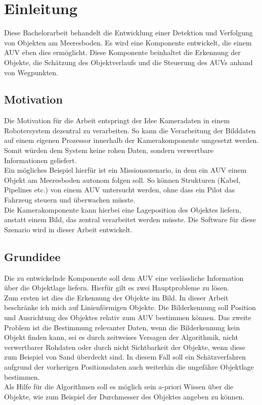 \section{Einleitung}
Diese Bachelorarbeit behandelt die Entwicklung einer Detektion und Verfolgung von Objekten am Meeresboden. Es wird eine Komponente entwickelt, die einem AUV eben dies ermöglicht. Diese Komponente beinhaltet die Erkennung der Objekte, die Schätzung des Objektverlaufs und die Steuerung des AUVs anhand von Wegpunkten.
\subsection{Motivation}
Die Motivation für die Arbeit entspringt der Idee Kameradaten in einem Robotersystem dezentral zu verarbeiten. So kann die Verarbeitung der Bilddaten auf einem eigenen Prozessor innerhalb der Kamerakomponente umgesetzt werden. Somit würden dem System keine rohen Daten, sondern verwertbare Informationen geliefert.\\
Ein mögliches Beispiel hierfür ist ein Missionsszenario, in dem ein AUV einem Objekt am Meeresboden autonom folgen soll. So können Strukturen (Kabel, Pipelines etc.) von einem AUV untersucht werden, ohne dass ein Pilot das Fahrzeug steuern und überwachen müsste.\\
Die Kamerakomponente kann hierbei eine Lageposition des Objektes liefern, anstatt einem Bild, das zentral verarbeitet werden müsste. Die Software für diese Szenario wird in dieser Arbeit entwickelt.\\

\subsection{Grundidee}
Die zu entwickelnde Komponente soll dem AUV eine verlässliche Information über die Objektlage liefern. Hierfür gilt es zwei Hauptprobleme zu lösen.\\
Zum ersten ist dies die Erkennung der Objekte im Bild. In dieser Arbeit beschränke ich mich auf Linienförmigen Objekte. Die Bilderkennung soll Position und Ausrichtung des Objektes relativ zum AUV bestimmen können.
Das zweite Problem ist die Bestimmung relevanter Daten, wenn die Bilderkennung kein Objekt finden kann, sei es durch zeitweises Versagen der Algorithmik, nicht verwertbarer Rohdaten oder durch nicht Sichtbarkeit der Objekte, wenn diese zum Beispiel von Sand überdeckt sind.
In diesem Fall soll ein Schätzverfahren aufgrund der vorherigen Positionsdaten auch weiterhin die ungefähre Objektlage bestimmen.\\
Als Hilfe für die Algorithmen soll es möglich sein a-priori Wissen über die Objekte, wie zum Beispiel der Durchmesser des Objektes angeben zu können.
